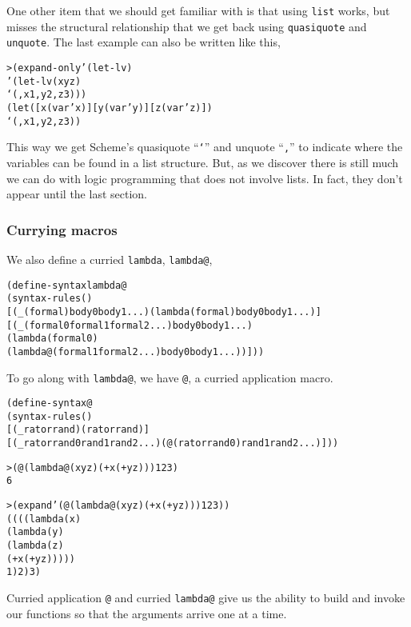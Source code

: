One other item that we should get familiar with is that using \texttt{list}
works, but misses the structural relationship that we get back using
\texttt{quasiquote} and \texttt{unquote}.  The last example can also be
written like this,

\begin{alltt}
> (expand-only '(let-lv)
    '(let-lv (x y z)
       `(,x 1 ,y 2 ,z 3)))
(let ([x (var 'x)] [y (var 'y)] [z (var 'z)])
  `(,x 1 ,y 2 ,z 3))
\end{alltt}

This way we get Scheme's quasiquote ``\texttt{`}'' and unquote
``\texttt{,}'' to indicate where the variables can be found in a
list structure.  But, as we discover there is still much we can do
with logic programming that does not involve lists.  In fact, they
don't appear until the last section.

\subsubsection{Currying macros}

We also define a curried \texttt{lambda}, \texttt{lambda@},

\begin{alltt}
(define-syntax lambda@
  (syntax-rules ()
    [(_ (formal) body0 body1 ...) (lambda (formal) body0 body1 ...)]
    [(_ (formal0 formal1 formal2 ...) body0 body1 ...)
     (lambda (formal0)
       (lambda@ (formal1 formal2 ...) body0 body1 ...))]))
\end{alltt}

To go along with \texttt{lambda@}, we have \texttt{@}, a curried
application macro.

\begin{alltt}
(define-syntax @
  (syntax-rules ()
    [(_ rator rand) (rator rand)]
    [(_ rator rand0 rand1 rand2 ...) (@ (rator rand0) rand1 rand2 ...)]))
\end{alltt}

\begin{alltt}
> (@ (lambda@ (x y z) (+ x (+ y z))) 1 2 3)
6

> (expand '(@ (lambda@ (x y z) (+ x (+ y z))) 1 2 3))
((((lambda (x)
     (lambda (y)
       (lambda (z)
         (+ x (+ y z)))))
   1) 2) 3)
\end{alltt}

Curried application \texttt{@} and curried \texttt{lambda@} give us
the ability to build and invoke our functions so that the arguments
arrive one at a time.


